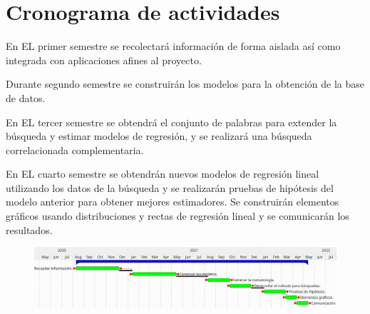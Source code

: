 \section {Cronograma de actividades}
En EL primer semestre se recolectará información de forma aislada así como integrada con aplicaciones afines al proyecto.

Durante segundo semestre se construirán los modelos para la obtención de la base de datos.

En EL tercer semestre se obtendrá el conjunto de palabras para extender la búsqueda y estimar modelos de regresión, y se realizará una búsqueda correlacionada complementaria.

En EL cuarto semestre se obtendrán nuevos modelos de regresión lineal utilizando los datos de la búsqueda y se realizarán pruebas de hipótesis del modelo anterior para obtener mejores estimadores. Se construirán elementos gráficos usando distribuciones y rectas de regresión lineal y se comunicarán los resultados.
\begin{figure}[H]\centering\includegraphics[width=.95\linewidth]{gantt.png}\end{figure}